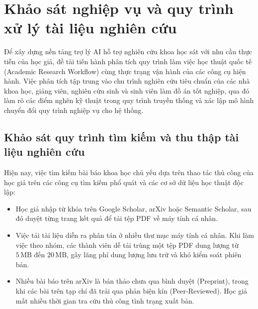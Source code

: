 \section{Khảo sát nghiệp vụ và quy trình xử lý tài liệu nghiên cứu}
\label{sec:khao_sat_nghiep_vu}

Để xây dựng nền tảng trợ lý AI hỗ trợ nghiên cứu khoa học sát với nhu cầu thực tiễn của học giả, đề tài tiến hành phân tích quy trình làm việc học thuật quốc tế (Academic Research Workflow) cùng thực trạng vận hành của các công cụ hiện hành. Việc phân tích tập trung vào chu trình nghiên cứu tiêu chuẩn của các nhà khoa học, giảng viên, nghiên cứu sinh và sinh viên làm đồ án tốt nghiệp, qua đó làm rõ các điểm nghẽn kỹ thuật trong quy trình truyền thống và xác lập mô hình chuyển đổi quy trình nghiệp vụ cho hệ thống.

\subsection{Khảo sát quy trình tìm kiếm và thu thập tài liệu nghiên cứu}
\label{subsec:khao_sat_tim_kiem}
Hiện nay, việc tìm kiếm bài báo khoa học chủ yếu dựa trên thao tác thủ công của học giả trên các công cụ tìm kiếm phổ quát và các cơ sở dữ liệu học thuật độc lập:
\begin{itemize}[noitemsep, topsep=2pt]
    \item Học giả nhập từ khóa trên Google Scholar, arXiv hoặc Semantic Scholar, sau đó duyệt từng trang kết quả để tải tệp PDF về máy tính cá nhân.
    \item Việc tải tài liệu diễn ra phân tán ở nhiều thư mục máy tính cá nhân. Khi làm việc theo nhóm, các thành viên dễ tải trùng một tệp PDF dung lượng từ $5\,\text{MB}$ đến $20\,\text{MB}$, gây lãng phí dung lượng lưu trữ và khó kiểm soát phiên bản.
    \item Nhiều bài báo trên arXiv là bản thảo chưa qua bình duyệt (Preprint), trong khi các bài trên tạp chí đã trải qua phản biện kín (Peer-Reviewed). Học giả mất nhiều thời gian tra cứu thủ công tình trạng xuất bản.
\end{itemize}

